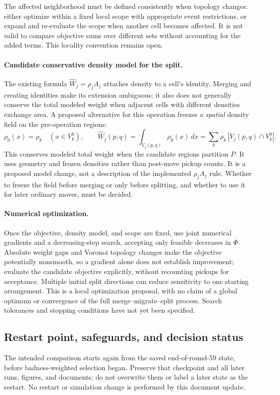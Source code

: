The affected neighborhood must be defined consistently when topology changes:
either optimize within a fixed local scope with appropriate event restrictions,
or expand and re-evaluate the scope when another cell becomes affected. It is
not valid to compare objective sums over different sets without accounting for
the added terms. This locality convention remains open.

\paragraph{Candidate conservative density model for the split.}
The existing formula $\widehat W_j=\rho_j A_j$ attaches density to a cell's
identity. Merging and creating identities make its extension ambiguous; it
also does not generally conserve the total modeled weight when adjacent
cells with different densities exchange area. A proposed alternative for this
operation freezes a \emph{spatial} density field on the pre-operation regions:
\[
 \rho_0(x)=\rho_k\quad(x\in V_k^0),\qquad
 \widehat W_j(p,q)=\int_{V_j(p,q)}\rho_0(x)\,dx
   =\sum_k\rho_k\,|V_j(p,q)\cap V_k^0|.
\]
This conserves modeled total weight when the candidate regions partition $P$.
It uses geometry and frozen densities rather than post-move pickup counts.
It is a proposed model change, not a description of the implemented
$\rho_j A_j$ rule. Whether to freeze the field before merging or only before
splitting, and whether to use it for later ordinary moves, must be decided.

\paragraph{Numerical optimization.}
Once the objective, density model, and scope are fixed, use joint numerical
gradients and a decreasing-step search, accepting only feasible decreases in
$\Phi$. Absolute weight gaps and Voronoi topology changes make the objective
potentially nonsmooth, so a gradient alone does not establish improvement;
evaluate the candidate objective explicitly, without recounting pickups for
acceptance. Multiple initial split directions can reduce sensitivity to one
starting arrangement. This is a local optimization proposal, with no claim of
a global optimum or convergence of the full merge--migrate--split process.
Search tolerances and stopping conditions have not yet been specified.

\subsection{Restart point, safeguards, and decision status}
The intended comparison starts again from the saved end-of-round-59 state,
before badness-weighted selection began. Preserve that checkpoint and all
later runs, figures, and documents; do not overwrite them or label a later
state as the restart. No restart or simulation change is performed by this
document update.

